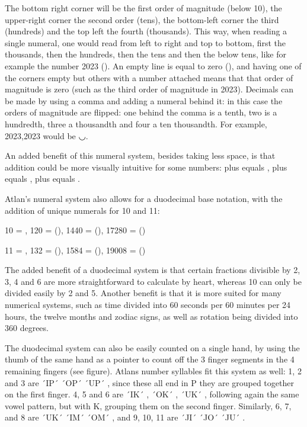 The bottom right corner will be the first order of magnitude (below 10), the upper-right corner the second order (tens), the bottom-left corner the third (hundreds) and the top left the fourth (thousands). This way, when reading a single numeral, one would read from left to right and top to bottom, first the thousands, then the hundreds, then the tens and then the below tens, like for example the number 2023 (). An empty line is equal to zero (), and having one of the corners empty but others with a number attached means that that order of magnitude is zero (such as the third order of magnitude in 2023). Decimals can be made by using a comma and adding a numeral behind it: in this case the orders of magnitude are flipped: one behind the comma is a tenth, two is a hundredth, three a thousandth and four a ten thousandth. For example, 2023,2023 would be ◡. 

An added benefit of this numeral system, besides taking less space, is that addition could be more visually intuitive for some numbers:  plus  equals ,  plus  equals ,  plus  equals . 

Atlan’s numeral system also allows for a duodecimal base notation, with the addition of unique numerals for 10 and 11: 

\vspace{0.2cm}
{\small
10 = , 120 = (), 1440 = (), 17280 = () 

11 = , 132 = (), 1584 = (), 19008 = () 
}
\vspace{0.2cm}

The added benefit of a duodecimal system is that certain fractions divisible by 2, 3, 4 and 6 are more straightforward to calculate by heart, whereas 10 can only be divided easily by 2 and 5. Another benefit is that it is more suited for many numerical systems, such as time divided into 60 seconds per 60 minutes per 24 hours, the twelve months and zodiac signs, as well as rotation being divided into 360 degrees.  

The duodecimal system can also be easily counted on a single hand, by using the thumb of the same hand as a pointer to count off the 3 finger segments in the 4 remaining fingers (see figure). Atlans number syllables fit this system as well: 1, 2 and 3 are ´IP´ \ip ´OP´ \op ´UP´ \up, since these all end in P they are grouped together on the first finger. 4, 5 and 6 are ´IK´ \raisebox{-0.5em}{\ik} , ´OK´ \raisebox{-0.5em}{\ok}, ´UK´ \raisebox{-0.5em}{\uk}, following again the same vowel pattern, but with K, grouping them on the second finger. Similarly, 6, 7, and 8 are ´UK´ \uk ´IM´ \im ´OM´ \om, and 9, 10, 11 are ´JI´ \ji ´JO´ \jo ´JU´ \ju. 


